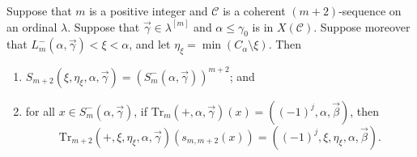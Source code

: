 \documentclass[10pt,a4paper]{amsart}
\newcommand{\mc}{\mathcal}
\begin{document}
\begin{lemma}\label{simulation}
  Suppose that $m$ is a positive integer and $\mc{C}$ is a coherent 
  $(m+2)$-sequence on an ordinal $\lambda$. Suppose that $\vec{\gamma} \in 
  \lambda^{[m]}$ and $\alpha \leq \gamma_0$ is in $X(\mc{C})$.
  Suppose moreover that $L_m^-(\alpha,\vec{\gamma}) < \xi < \alpha$, and
  let $\eta_\xi = \min(C_\alpha \setminus \xi)$. Then
  \begin{enumerate}
    \item $S_{m+2}(\xi,\eta_\xi,\alpha,\vec{\gamma}) = 
    (S^-_m(\alpha,\vec{\gamma}))^{m+2}$; and
    \item for all $x \in S^-_m(\alpha,\vec{\gamma})$, if 
    $\mathrm{Tr}_m(+,\alpha,\vec{\gamma})(x) = ((-1)^j,\alpha,\vec{\beta})$, 
    then 
    \[
      \mathrm{Tr}_{m+2}(+,\xi,\eta_\xi,\alpha,\vec{\gamma})(s_{m,m+2}(x)) = 
      ((-1)^j,\xi,\eta_\xi,\alpha,\vec{\beta}).
    \]
  \end{enumerate}
\end{lemma}
\end{document}
